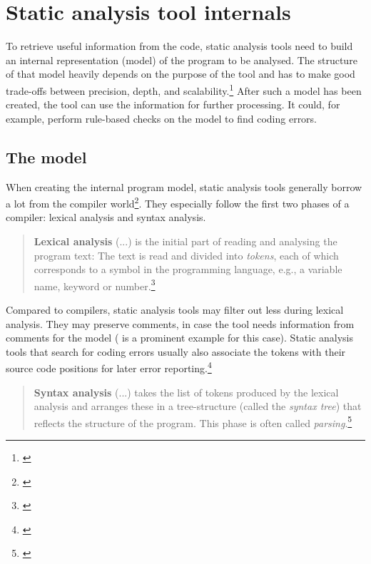 \section{Static analysis tool internals}

To retrieve useful information from the code, static analysis tools need to build an internal representation (model) of the program to be analysed. The structure of that model heavily depends on the purpose of the tool and has to make good trade-offs between precision, depth, and scalability.\footnote{\citep[45]{SecureProgramming}} After such a model has been created, the tool can use the information for further processing. It could, for example, perform rule-based checks on the model to find coding errors.

\subsection{The model}

When creating the internal program model, static analysis tools generally borrow a lot from the compiler world\footnote{\citep[72]{SecureProgramming}}. They especially follow the first two phases of a compiler: lexical analysis and syntax analysis.

\begin{quotation}
\textbf{Lexical analysis} (...) is the initial part of reading and analysing the program text: The text is read and divided into \textit{tokens}, each of which corresponds to a symbol in the programming language, e.g., a variable name, keyword or number.\footnote{\citep[2]{CompilerBasics}}
\end{quotation}

Compared to compilers, static analysis tools may filter out less during lexical analysis. They may preserve comments, in case the tool needs information from comments for the model ( is a prominent example for this case).
Static analysis tools that search for coding errors usually also associate the tokens with their source code positions for later error reporting.\footnote{\citep[72]{SecureProgramming}} 

\begin{quotation}
\textbf{Syntax analysis} (...) takes the list of tokens produced by the lexical analysis and arranges these in a tree-structure (called the \textit{syntax tree}) that reflects the structure of the program. This phase is often called \textit{parsing}.\footnote{\citep[2]{CompilerBasics}}
\end{quotation}

